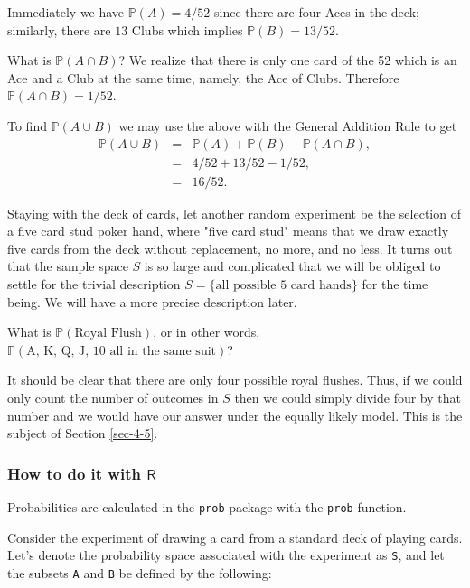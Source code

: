Immediately we have \(\mathbb{P}(A) = 4/52\) since there are four Aces
in the deck; similarly, there are \(13\) Clubs which implies
\(\mathbb{P}(B) = 13/52\).

What is \(\mathbb{P}(A\cap B)\)? We realize that there is only one
card of the 52 which is an Ace and a Club at the same time, namely,
the Ace of Clubs. Therefore \(\mathbb{P}(A\cap B)=1/52\).

To find \(\mathbb{P}(A\cup B)\) we may use the above with the General
Addition Rule to get
\begin{eqnarray*}
\mathbb{P}(A\cup B) & = & \mathbb{P}(A) + \mathbb{P}(B) - \mathbb{P}(A \cap B),\\
 & = & 4/52 + 13/52 - 1/52,\\
 & = & 16/52.
\end{eqnarray*}




Staying with the deck of cards, let another random experiment be the
selection of a five card stud poker hand, where "five card stud"
means that we draw exactly five cards from the deck without
replacement, no more, and no less. It turns out that the sample space
\(S\) is so large and complicated that we will be obliged to settle
for the trivial description \( S = \{ \mbox{all possible 5 card hands}
\} \) for the time being. We will have a more precise description
later.

What is \(\mathbb{P}(\mbox{Royal Flush})\), or in other words,
\(\mathbb{P}(\mbox{A, K, Q, J, 10 all in the same suit})\)?

It should be clear that there are only four possible royal
flushes. Thus, if we could only count the number of outcomes in \(S\)
then we could simply divide four by that number and we would have our
answer under the equally likely model. This is the subject of Section
\ref{sec-4-5}.

\subsubsection{How to do it with \(\mathsf{R}\)}
\label{sec-4-4-3-1}

Probabilities are calculated in the \texttt{prob} package \cite{prob} with
the \texttt{prob} function.

Consider the experiment of drawing a card from a standard deck of
playing cards. Let's denote the probability space associated with the
experiment as \texttt{S}, and let the subsets \texttt{A} and \texttt{B} be defined by the
following:


